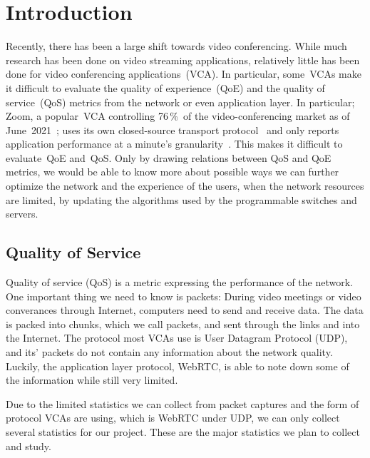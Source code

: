 \section{Introduction}\label{introduction}
    Recently, there has been a large shift towards video conferencing. While much research has been done on video streaming applications, relatively little has been done for video conferencing applications~(VCA). In particular, some~VCAs make it difficult to evaluate the quality of experience~(QoE) and the quality of service~(QoS) metrics from the network or even application layer. In particular; Zoom, a popular~VCA controlling 76\,\%~of the video-conferencing market as of June~2021~\autocite{kim2021}; uses its own closed-source transport protocol~\autocite{marczak2020} and only reports application performance at a minute's granularity~\autocite{walia2019}. This makes it difficult to evaluate~QoE and~QoS. Only by drawing relations between QoS and QoE metrics, we would be able to know more about possible ways we can further optimize the network and the experience of the users, when the network resources are limited, by updating the algorithms used by the programmable switches and servers. 

    \subsection{Quality of Service}\label{introduction:qos}
        Quality of service (QoS) is a metric expressing the performance of the network. One important thing we need to know is packets: During video meetings or video converances through Internet, computers need to send and receive data. The data is packed into chunks, which we call packets, and sent through the links and into the Internet. The protocol most VCAs use is User Datagram Protocol (UDP), and its' packets do not contain any information about the network quality. Luckily, the application layer protocol, WebRTC, is able to note down some of the information while still very limited.
        
        Due to the limited statistics we can collect from packet captures and the form of protocol VCAs are using, which is WebRTC under UDP, we can only collect several statistics for our project. These are the major statistics we plan to collect and study.

